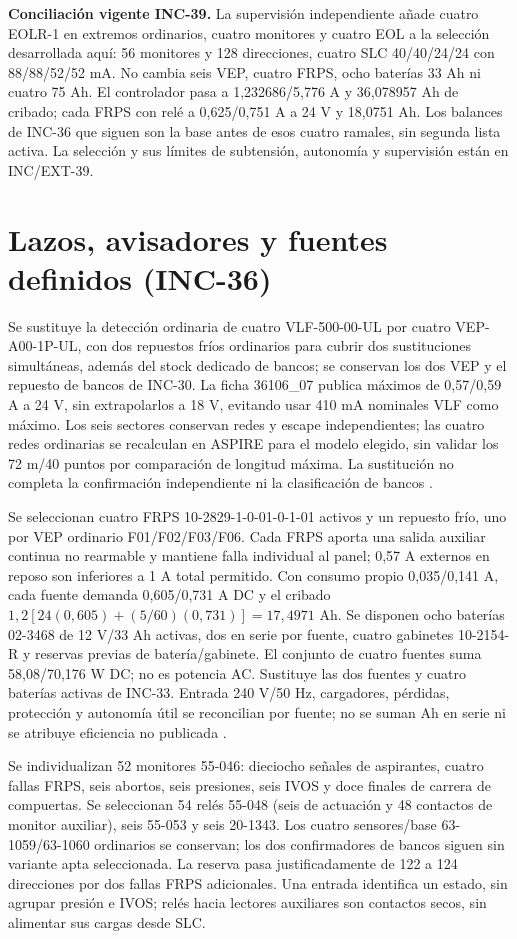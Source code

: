 \textbf{Conciliación vigente INC-39.} La supervisión independiente añade cuatro EOLR-1 en extremos ordinarios, cuatro monitores y cuatro EOL a la selección desarrollada aquí: 56 monitores y 128 direcciones, cuatro SLC 40/40/24/24 con 88/88/52/52 mA. No cambia seis VEP, cuatro FRPS, ocho baterías 33 Ah ni cuatro 75 Ah. El controlador pasa a 1,232686/5,776 A y 36,078957 Ah de cribado; cada FRPS con relé a 0,625/0,751 A a 24 V y 18,0751 Ah. Los balances de INC-36 que siguen son la base antes de esos cuatro ramales, sin segunda lista activa. La selección y sus límites de subtensión, autonomía y supervisión están en INC/EXT-39.

\section{Lazos, avisadores y fuentes definidos (INC-36)}
\label{sec:sd4-inc36}
Se sustituye la detección ordinaria de cuatro VLF-500-00-UL por cuatro VEP-A00-1P-UL, con dos repuestos fríos ordinarios para cubrir dos sustituciones simultáneas, además del stock dedicado de bancos; se conservan los dos VEP y el repuesto de bancos de INC-30. La ficha 36106\_07 publica máximos de 0,57/0,59 A a 24 V, sin extrapolarlos a 18 V, evitando usar 410 mA nominales VLF como máximo. Los seis sectores conservan redes y escape independientes; las cuatro redes ordinarias se recalculan en ASPIRE para el modelo elegido, sin validar los 72 m/40 puntos por comparación de longitud máxima. La sustitución no completa la confirmación independiente ni la clasificación de bancos \parencite[p.~2]{lote30-vep36106}.

Se seleccionan cuatro FRPS 10-2829-1-0-01-0-1-01 activos y un repuesto frío, uno por VEP ordinario F01/F02/F03/F06. Cada FRPS aporta una salida auxiliar continua no rearmable y mantiene falla individual al panel; 0,57 A externos en reposo son inferiores a 1 A total permitido. Con consumo propio 0,035/0,141 A, cada fuente demanda 0,605/0,731 A DC y el cribado $1,2[24(0,605)+(5/60)(0,731)]=17,4971$ Ah. Se disponen ocho baterías 02-3468 de 12 V/33 Ah activas, dos en serie por fuente, cuatro gabinetes 10-2154-R y reservas previas de batería/gabinete. El conjunto de cuatro fuentes suma 58,08/70,176 W DC; no es potencia AC. Sustituye las dos fuentes y cuatro baterías activas de INC-33. Entrada 240 V/50 Hz, cargadores, pérdidas, protección y autonomía útil se reconcilian por fuente; no se suman Ah en serie ni se atribuye eficiencia no publicada \parencite[pp.~1--2]{lote33-frps}.

Se individualizan 52 monitores 55-046: dieciocho señales de aspirantes, cuatro fallas FRPS, seis abortos, seis presiones, seis IVOS y doce finales de carrera de compuertas. Se seleccionan 54 relés 55-048 (seis de actuación y 48 contactos de monitor auxiliar), seis 55-053 y seis 20-1343. Los cuatro sensores/base 63-1059/63-1060 ordinarios se conservan; los dos confirmadores de bancos siguen sin variante apta seleccionada. La reserva pasa justificadamente de 122 a 124 direcciones por dos fallas FRPS adicionales. Una entrada identifica un estado, sin agrupar presión e IVOS; relés hacia lectores auxiliares son contactos secos, sin alimentar sus cargas desde SLC.

